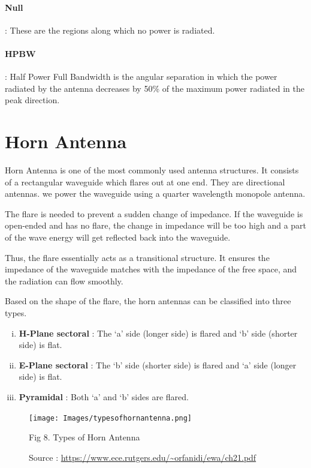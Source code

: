\documentclass[12pt]{article}
\begin{document}
\paragraph{Null} : These are the regions along which no power is radiated. 
\paragraph{HPBW} : Half Power Full Bandwidth is the angular separation in which the power radiated by the antenna decreases by 50\% of the maximum power radiated in the peak direction.
\section{Horn Antenna}
Horn Antenna is one of the most commonly used antenna structures. It consists of a rectangular waveguide which flares out at one end. They are directional antennas. we power the waveguide using a quarter wavelength monopole antenna. \linebreak

The flare is needed to prevent a sudden change of impedance. If the waveguide is open-ended and has no flare, the change in impedance will be too high and a part of the wave energy will get reflected back into the waveguide. \linebreak 

Thus, the flare essentially acts as a transitional structure. It ensures the impedance of the waveguide matches with the impedance of the free space, and the radiation can flow smoothly. \linebreak

Based on the shape of the flare, the horn antennas can be classified into three types.
\begin{enumerate}[i.)]
  \item \textbf{H-Plane sectoral} : The `a' side (longer side) is flared and `b' side (shorter side) is flat.
  \item \textbf{E-Plane sectoral} : The `b' side (shorter side) is flared and `a' side (longer side) is flat.
  \item \textbf{Pyramidal} : Both `a' and `b' sides are flared.
\end{enumerate}
\begin{figure}[H]
  \centering
  \texttt{[image: Images/typesofhornantenna.png]}
  \caption{Fig 8. Types of Horn Antenna}
  \caption{\tiny Source : \url{https://www.ece.rutgers.edu/~orfanidi/ewa/ch21.pdf}}
\end{figure}
\end{document}
